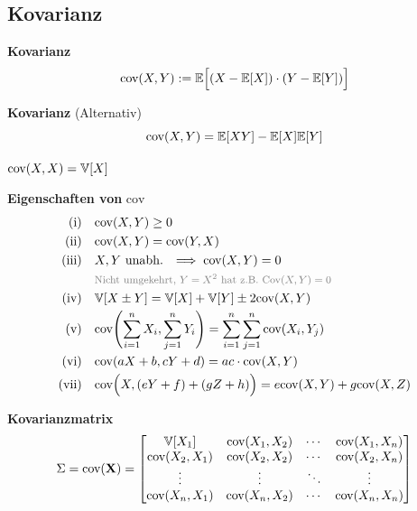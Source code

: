 \newpage
\subsection{Kovarianz}

 \textbf{Kovarianz}\\
$$
    \text{cov}(X,Y) := \mathbb{E}\Bigl[ (X-\mathbb{E}[X])\cdot(Y-\mathbb{E}[Y]) \Bigr]
$$

\lemma \textbf{Kovarianz} (Alternativ)
$$
    \text{cov}(X,Y) = \mathbb{E}[XY] - \mathbb{E}[X]\mathbb{E}[Y]
$$

\remark $\text{cov}(X,X) = \mathbb{V}[X]$

\lemma \textbf{Eigenschaften von} $\text{cov}$
\begin{align*}
    \text{(i)}\quad         & \text{cov}(X,Y) \geq 0 \\
    \text{(ii)}\quad        & \text{cov}(X,Y) = \text{cov}(Y,X) \\
    \text{(iii)}\quad       & X,Y \text{ unabh. } \implies \text{cov}(X,Y) = 0\\
                            & \text{\color{gray}\footnotesize Nicht umgekehrt, $Y=X^2$ hat z.B. $\text{Cov}(X,Y)=0$} \\
    \text{(iv)}\quad        & \V[X \pm Y] = \V[X] + \V[Y] \pm 2\text{cov}(X,Y) \\
    \text{(v)}\quad         & \text{cov}\Biggl( \sum_{i=1}^{n}X_i,\sum_{j=1}^{n}Y_i \Biggr) = \sum_{i=1}^{n}\sum_{j=1}^{n}\text{cov}(X_i,Y_j) \\
    \text{(vi)}\quad        & \text{cov}(aX+b, cY+d) = ac\cdot\text{cov}(X,Y) \\
    \text{(vii)}\quad       & \text{cov}\Bigl(X, (eY+f) + (gZ+h)\Bigr) = e\text{cov}(X,Y) + g\text{cov}(X,Z)
\end{align*}

 \textbf{Kovarianzmatrix} 
{\small
    $$
    \Sigma = \text{cov}(\textbf{X}) = \begin{bmatrix}
        \mathbb{V}[X_1] & \text{cov}(X_1,X_2) & \cdots & \text{cov}(X_1,X_n) \\
        \text{cov}(X_2,X_1) & \text{cov}(X_2,X_2) & \cdots & \text{cov}(X_2,X_n) \\
        \vdots & \vdots & \ddots & \vdots \\
        \text{cov}(X_n,X_1) & \text{cov}(X_n,X_2) & \cdots & \text{cov}(X_n,X_n)
    \end{bmatrix}
    $$
}

